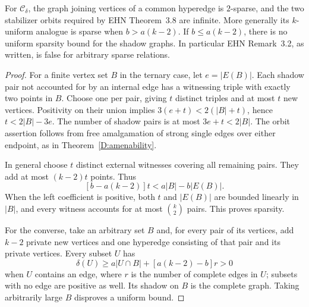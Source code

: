 \begin{proposition}
\label{D:shadow}
For $\mathcal C_\delta$, the graph joining vertices of a common
hyperedge is $2$-sparse, and the two stabilizer orbits required by
EHN Theorem~3.8 are infinite. More generally its $k$-uniform analogue
is sparse when $b>a(k-2)$. If $b\leq a(k-2)$, there is no uniform
sparsity bound for the shadow graphs. In particular EHN Remark~3.2,
as written, is false for arbitrary sparse relations.
\end{proposition}
\begin{proof}
For a finite vertex set $B$ in the ternary case, let $e=|E(B)|$.
Each shadow pair not accounted for by an internal edge has a
witnessing triple with exactly two points in $B$. Choose one per
pair, giving $t$ distinct triples and at most $t$ new vertices.
Positivity on their union implies
$3(e+t)<2(|B|+t)$, hence $t<2|B|-3e$. The number of shadow
pairs is at most $3e+t<2|B|$. The orbit assertion follows from
free amalgamation of strong single edges over either endpoint,
as in Theorem~\ref{D:amenability}.

In general choose $t$ distinct external witnesses covering all
remaining pairs. They add at most $(k-2)t$ points. Thus
\[
 [b-a(k-2)]t<a|B|-b|E(B)|.
\]
When the left coefficient is positive, both $t$ and $|E(B)|$ are
bounded linearly in $|B|$, and every witness accounts for at most
$\binom{k}{2}$ pairs. This proves sparsity.

For the converse, take an arbitrary set $B$ and, for every pair
of its vertices, add $k-2$ private new vertices and one hyperedge
consisting of that pair and its private vertices. Every subset $U$
has
\[
 \delta(U)\geq a|U\cap B|+
          [a(k-2)-b]r>0
\]
when $U$ contains an edge, where $r$ is the number of complete
edges in $U$; subsets with no edge are positive as well.
Its shadow on $B$ is the complete graph. Taking arbitrarily large
$B$ disproves a uniform bound.


\end{proof}
